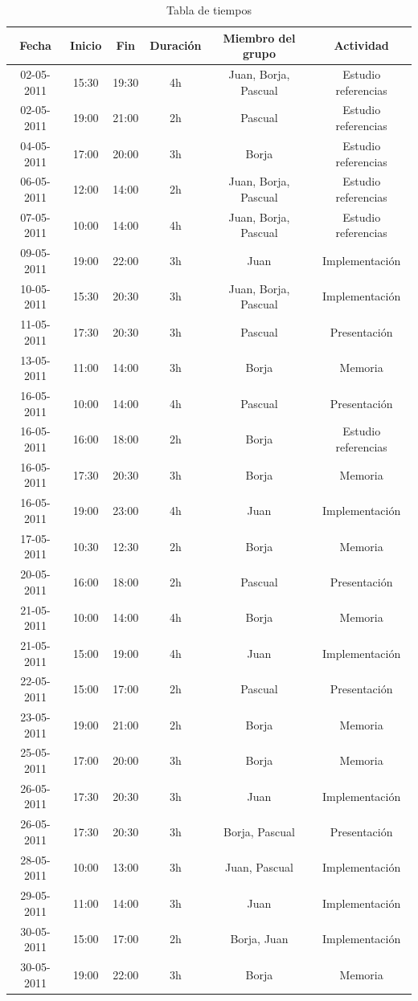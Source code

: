 \documentclass[12pt]{article}
\begin{document}
\begin{table}[h]

\centering
\begin{tabular}{|c|c|c|c|c|c|}
\hline Fecha & Inicio & Fin & Duración & Miembro del grupo & Actividad  \\ 
\hline 02-05-2011 & 15:30 & 19:30 & 4h & Juan, Borja, Pascual & Estudio referencias  \\
\hline 02-05-2011 & 19:00 & 21:00 & 2h & Pascual & Estudio referencias  \\
\hline 04-05-2011 & 17:00 & 20:00 & 3h & Borja & Estudio referencias  \\
\hline 06-05-2011 & 12:00 & 14:00 & 2h & Juan, Borja, Pascual & Estudio referencias  \\
\hline 07-05-2011 & 10:00 & 14:00 & 4h & Juan, Borja, Pascual & Estudio referencias  \\
\hline 09-05-2011 & 19:00 & 22:00 & 3h & Juan & Implementación  \\
\hline 10-05-2011 & 15:30 & 20:30 & 3h & Juan, Borja, Pascual & Implementación \\
\hline 11-05-2011 & 17:30 & 20:30 & 3h & Pascual & Presentación \\
\hline 13-05-2011 & 11:00 & 14:00 & 3h & Borja & Memoria \\
\hline 16-05-2011 & 10:00 & 14:00 & 4h & Pascual & Presentación \\
\hline 16-05-2011 & 16:00 & 18:00 & 2h & Borja & Estudio referencias \\
\hline 16-05-2011 & 17:30 & 20:30 & 3h & Borja & Memoria \\
\hline 16-05-2011 & 19:00 & 23:00 & 4h & Juan & Implementación \\
\hline 17-05-2011 & 10:30 & 12:30 & 2h & Borja & Memoria \\
\hline 20-05-2011 & 16:00 & 18:00 & 2h & Pascual & Presentación \\
\hline 21-05-2011 & 10:00 & 14:00 & 4h & Borja & Memoria \\
\hline 21-05-2011 & 15:00 & 19:00 & 4h & Juan & Implementación \\
\hline 22-05-2011 & 15:00 & 17:00 & 2h & Pascual & Presentación \\
\hline 23-05-2011 & 19:00 & 21:00 & 2h & Borja & Memoria \\
\hline 25-05-2011 & 17:00 & 20:00 & 3h & Borja & Memoria \\
\hline 26-05-2011 & 17:30 & 20:30 & 3h & Juan & Implementación \\
\hline 26-05-2011 & 17:30 & 20:30 & 3h & Borja, Pascual & Presentación \\
\hline 28-05-2011 & 10:00 & 13:00 & 3h & Juan, Pascual & Implementación \\
\hline 29-05-2011 & 11:00 & 14:00 & 3h & Juan & Implementación \\
\hline 30-05-2011 & 15:00 & 17:00 & 2h & Borja, Juan & Implementación \\
\hline 30-05-2011 & 19:00 & 22:00 & 3h & Borja & Memoria \\
\hline 
\end{tabular}

\caption{Tabla de tiempos}
\end{table}
\end{document}
